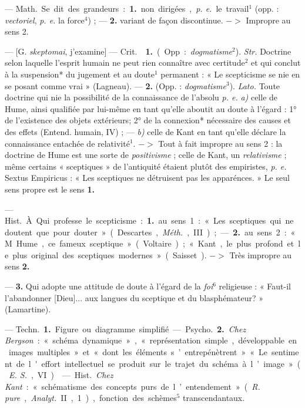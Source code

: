 \begin{itemize}[leftmargin=1cm, label=, itemsep=1pt]
 — \si{Math.} Se dit des grandeurs : {\bf 1.} non dirigées,
{\it p. e.} le travail$^1$ (opp. : {\it vectoriel}, {\it p. e.} la
force$^4$) ; — {\bf 2.} variant de façon discontinue. $->$ Impropre au sens 2.

 — [G. {\it skeptomai}, j'examine] — \si{Crit.}
 {\bf 1.} (Opp. : {\it dogmatisme}$^2$). {\it Str.} Doctrine
selon laquelle l'esprit humain ne peut rien connaître avec certitude$^2$ et
qui conclut à la suspension* du jugement et au doute$^1$ permanent : « Le
scepticisme se nie en se posant comme vrai » (Lagneau). — {\bf 2.} (Opp. :
{\it dogmatisme}$^3$). {\it Lato.} Toute doctrine qui nie la possibilité de
la connaissance de l'absolu {\it p. e.} {\it a)} celle de Hume, ainsi
qualifiée par lui-même en tant qu’elle aboutit au doute à l'égard : 1° de
l’existence des objets extérieurs; 2° de la connexion* nécessaire des causes
et des effets (Entend. humain, IV) ; — {\it b)} celle de Kant en tant qu’elle
déclare la connaissance entachée de relativité$^1$. $->$ Tout à fait impropre
au sens 2 : la doctrine de Hume est une sorte de {\it positivisme} ; celle de
Kant, un {\it relativisme} ; même certains « sceptiques » de l'antiquité
étaient plutôt des empiristes, {\it p. e.} Sextus Empiricus : « Les
sceptiques ne détruisent pas les apparénces. » Le seul sens propre est le
sens {\bf 1.}

 — \si{Hist.} À. Qui professe le scepticisme : {\bf 1.} au
sens 1 : « Les sceptiques qui ne doutent que pour douter » (Descartes,
{\it Méth.}, III) ; —  {\bf 2.} au sens 2 : « M. Hume, ce fameux
sceptique... » (Voltaire) ; « Kant, le
plus profond et le plus original des sceptiques modernes... » (Saisset).
$->$ Très impropre au sens {\bf 2.}

—  {\bf 3.} Qui adopte une attitude de doute à l’égard de
la {\it foi}$^6$ religieuse : « Faut-il l’abandonner [Dieu]... aux langues
du sceptique et du blasphémateur? » (Lamartine).

 — \si{Techn.} {\bf 1.} Figure ou diagramme simplifié. —
\si{Psycho.} {\bf 2.} {\it Chez Bergson} : « schéma dynamique »,
« représentation simple, développable en images multiples » et « dont les
éléments s’entrepénètrent » « Le sentiment de l'effort intellectuel se
produit sur le trajet du schéma à l’image » ({\it E. S.}, VI).

 — \si{Hist.} {\it Chez Kant} : « schématisme des concepts
purs de l’entendement » ({\it R. pure}, {\it Analyt.} II, 1), fonction des
schèmes$^5$ transcendantaux.


\end{itemize}
